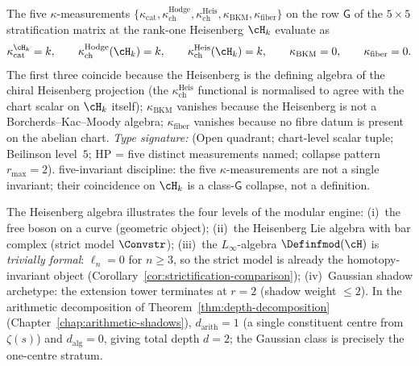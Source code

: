 \begin{remark}
\label{rem:heisenberg-five-kappa-stratification}
The five $\kappa$-measurements
$\{\kappa_{\mathrm{cat}}, \kappa^{\mathrm{Hodge}}_{\mathrm{ch}},
\kappa^{\mathrm{Heis}}_{\mathrm{ch}}, \kappa_{\mathrm{BKM}},
\kappa_{\mathrm{fiber}}\}$ on the row $\mathsf{G}$ of the
$5\times 5$ stratification matrix at the rank-one Heisenberg
$\cH_k$ evaluate as
\[
\kappa_{\mathrm{cat}}^{\cH_k}=k,\qquad
\kappa^{\mathrm{Hodge}}_{\mathrm{ch}}(\cH_k)=k,\qquad
\kappa^{\mathrm{Heis}}_{\mathrm{ch}}(\cH_k)=k,\qquad
\kappa_{\mathrm{BKM}}=0,\qquad
\kappa_{\mathrm{fiber}}=0.
\]
The first three coincide because the Heisenberg is the
defining algebra of the chiral Heisenberg projection (the
$\kappa^{\mathrm{Heis}}_{\mathrm{ch}}$ functional is normalised to
agree with the chart scalar on $\cH_k$ itself);
$\kappa_{\mathrm{BKM}}$ vanishes because the Heisenberg is not a
Borcherds--Kac--Moody algebra; $\kappa_{\mathrm{fiber}}$ vanishes
because no fibre datum is present on the abelian chart.
\emph{Type signature:} (Open quadrant; chart-level scalar tuple;
Beilinson level~$5$; HP = five distinct measurements named;
collapse pattern $r_{\max}=2$). five-invariant discipline: the five
$\kappa$-measurements are not a single invariant; their coincidence
on $\cH_k$ is a class-$\mathsf{G}$ collapse, not a definition.
\end{remark}

\begin{remark}
\label{rem:heisenberg-four-level}
The Heisenberg algebra illustrates the four levels of the modular
engine:
(i)~the free boson on a curve (geometric object);
(ii)~the Heisenberg Lie algebra with bar complex
(strict model $\Convstr$);
(iii)~the $L_\infty$-algebra $\Definfmod(\cH)$ is
\emph{trivially formal}: $\ell_n = 0$ for $n \geq 3$, so
the strict model is already the homotopy-invariant object
(Corollary~\ref{cor:strictification-comparison});
(iv)~Gaussian shadow archetype: the extension tower terminates
at $r = 2$ (shadow weight $\leq 2$).
In the arithmetic decomposition of
Theorem~\textup{\ref{thm:depth-decomposition}} (Chapter~\textup{\ref{chap:arithmetic-shadows}}),
$d_{\mathrm{arith}} = 1$ (a single constituent centre from $\zeta(s)$)
and $d_{\mathrm{alg}} = 0$, giving total depth $d = 2$; the
Gaussian class is precisely the one-centre stratum.
\end{remark}

